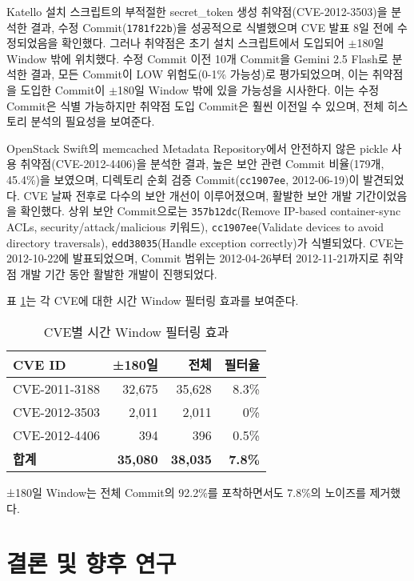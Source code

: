 ﻿\documentclass[conference]{IEEEtran}
\begin{document}
Katello 설치 스크립트의 부적절한 secret\_token 생성 취약점(CVE-2012-3503)을 분석한 결과, 수정 Commit(\texttt{1781f22b})을 성공적으로 식별했으며 CVE 발표 8일 전에 수정되었음을 확인했다. 그러나 취약점은 초기 설치 스크립트에서 도입되어 $\pm$180일 Window 밖에 위치했다. 수정 Commit 이전 10개 Commit을 Gemini 2.5 Flash로 분석한 결과, 모든 Commit이 LOW 위험도(0-1\% 가능성)로 평가되었으며, 이는 취약점을 도입한 Commit이 $\pm$180일 Window 밖에 있을 가능성을 시사한다. 이는 수정 Commit은 식별 가능하지만 취약점 도입 Commit은 훨씬 이전일 수 있으며, 전체 히스토리 분석의 필요성을 보여준다.

OpenStack Swift의 memcached Metadata Repository에서 안전하지 않은 pickle 사용 취약점(CVE-2012-4406)을 분석한 결과, 높은 보안 관련 Commit 비율(179개, 45.4\%)을 보였으며, 디렉토리 순회 검증 Commit(\texttt{cc1907ee}, 2012-06-19)이 발견되었다. CVE 날짜 전후로 다수의 보안 개선이 이루어졌으며, 활발한 보안 개발 기간이었음을 확인했다. 상위 보안 Commit으로는 \texttt{357b12dc}(Remove IP-based container-sync ACLs, security/attack/malicious 키워드), \texttt{cc1907ee}(Validate devices to avoid directory traversals), \texttt{edd38035}(Handle exception correctly)가 식별되었다. CVE는 2012-10-22에 발표되었으며, Commit 범위는 2012-04-26부터 2012-11-21까지로 취약점 개발 기간 동안 활발한 개발이 진행되었다.

표 \ref{tab:time_window_effect}는 각 CVE에 대한 시간 Window 필터링 효과를 보여준다.

\begin{table}[h]
\centering
\caption{CVE별 시간 Window 필터링 효과}
\label{tab:time_window_effect}
\begin{tabular}{lrrr}
\toprule
\textbf{CVE ID} & \textbf{±180일} & \textbf{전체} & \textbf{필터율} \\
\midrule
CVE-2011-3188 & 32,675 & 35,628 & 8.3\% \\
CVE-2012-3503 & 2,011 & 2,011 & 0\% \\
CVE-2012-4406 & 394 & 396 & 0.5\% \\
\midrule
\textbf{합계} & \textbf{35,080} & \textbf{38,035} & \textbf{7.8\%} \\
\bottomrule
\end{tabular}
\end{table}

±180일 Window는 전체 Commit의 92.2\%를 포착하면서도 7.8\%의 노이즈를 제거했다.


\section{결론 및 향후 연구}
\end{document}
